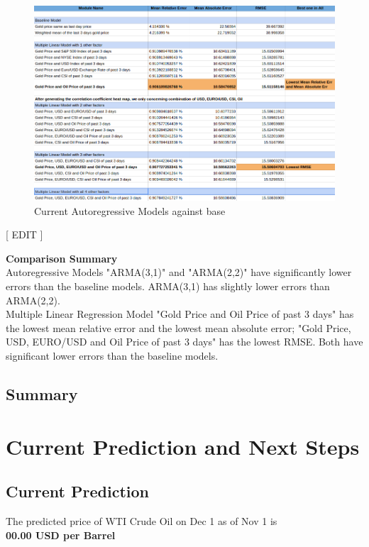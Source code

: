 \documentclass[runningheads]{llncs}
\begin{document}
\begin{figure}
\centering
\includegraphics[width=\textwidth]{GoldMLRAgainstBase_Daily.png}
\caption{Current Autoregressive Models against base}
\label{fig:GoldMLRAgainstBase_Daily.png}
\end{figure}

[ EDIT ]

\noindent\textbf{Comparison Summary} \\
Autoregressive Models "ARMA(3,1)" and "ARMA(2,2)" have significantly lower errors than the baseline models. ARMA(3,1) has slightly lower errors 
than ARMA(2,2). \\
Multiple Linear Regression Model "Gold Price and Oil Price of past 3 days" has the lowest mean relative error and the lowest mean absolute error; 
 "Gold Price, USD, EURO/USD and Oil Price of past 3 days" has the lowest RMSE.
Both have significant lower errors than the baseline models. \\

\subsection{Summary}

\newpage

\section{Current Prediction and Next Steps}

\subsection {Current Prediction}
\noindent The predicted price of WTI Crude Oil on Dec 1 as of Nov 1 is \\
\textbf{00.00 USD per Barrel} \\
\end{document}
